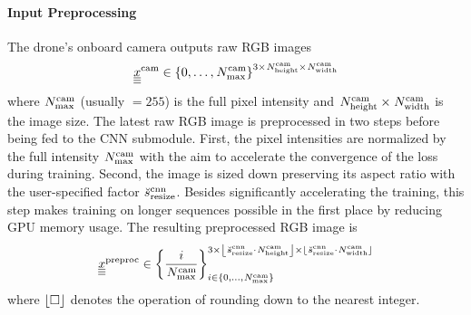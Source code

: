 \paragraph*{Input Preprocessing} ${}$\\
The drone's onboard camera 
outputs raw RGB images
\begin{equation}
    {}_{}^{} {\underline{\underline{\underline x}}}^{\text{cam}}_{} \in \left\{ 0, \dots, {}_{}^{} {N}^{\text{cam}}_{\text{max}} \right\}^{
        3 \times {}_{}^{} {N}^{\text{cam}}_{\text{height}} \times {}_{}^{} {N}^{\text{cam}}_{\text{width}}}
\end{equation}
where 
${}_{}^{} {N}^{\text{cam}}_{\text{max}}$ (usually $= 255$) is the full pixel intensity 
and
${}_{}^{} {N}^{\text{cam}}_{\text{height}} \times {}_{}^{} {N}^{\text{cam}}_{\text{width}}$
is the image size.
The latest raw RGB image is preprocessed in two steps
before being fed to the CNN submodule.
First, the pixel intensities are normalized by the full intensity 
${}_{}^{} {N}^{\text{cam}}_{\text{max}}$ with the aim
to accelerate the convergence of the loss during training.
Second, the image is sized down 
preserving its aspect ratio
with the user-specified factor ${}_{}^{} \breve{s}^{\text{cnn}}_{\text{resize}}$.
Besides significantly accelerating the training,
this step makes training on longer sequences possible
in the first place by reducing GPU memory usage.
The resulting preprocessed RGB image is
\begin{equation} \label{eq:rgb_preproc}
    {}_{}^{} {\underline{\underline{\underline x}}}^{\text{preproc}}_{} \in \left\{ \frac{i}{{}_{}^{} {N}^{\text{cam}}_{\text{max}}} \right\}_{
        i \in \left\{ 0, \dots, {}_{}^{} {N}^{\text{cam}}_{\text{max}} \right\}
    }^{
        3 \times 
        \left\lfloor {}_{}^{} \breve{s}^{\text{cnn}}_{\text{resize}} \cdot {}_{}^{} {N}^{\text{cam}}_{\text{height}} \right\rfloor \times 
        \left\lfloor {}_{}^{} \breve{s}^{\text{cnn}}_{\text{resize}} \cdot {}_{}^{} {N}^{\text{cam}}_{\text{width}} \right\rfloor
    }
\end{equation} 
where $\left\lfloor \square \right\rfloor$ denotes the operation of rounding down to the nearest integer.



